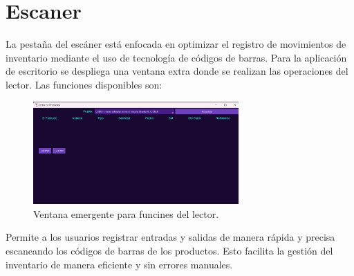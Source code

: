 \section{Escaner}

La pestaña del escáner está enfocada en optimizar el registro de movimientos de inventario mediante el uso de tecnología de códigos de barras. Para la aplicación de escritorio se despliega una ventana extra donde se realizan las operaciones del lector. Las funciones disponibles son: 

\begin{figure}[ht!]
\centering
\includegraphics[width=0.7\textwidth]{imgs/LectorApp.png}
\caption{Ventana emergente para funcines del lector.}
\label{fig:lecotr}
\end{figure}

Permite a los usuarios registrar entradas y salidas de manera rápida y precisa escaneando los códigos de barras de los productos. Esto facilita la gestión del inventario de manera eficiente y sin errores manuales.

